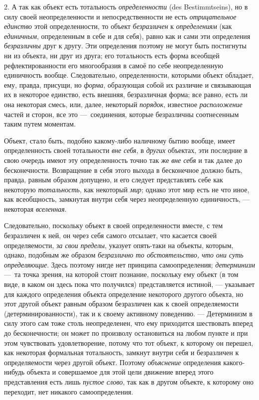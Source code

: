 \documentclass[twoside]{article}
\begin{document}
{{{{{{2. А так как объект есть тотальность
{\em определенности} (des
Bestimmtseins), но в силу своей неопределенности и
непосредственности не есть
{\em отрицательное единство}
этой определенности, то объект
{\em безразличен} к
{\em определениям} (как
{\em единичным},
определенным в себе и для себя), равно как и сами эти
определения {\em безразличны}
друг к другу. Эти определения поэтому не могут быть
постигнуты ни из объекта, ни друг из друга; его тотальность есть форма
всеобщей рефлектированности его многообразия в самоё по себе неопределенную
единичность вообще. Следовательно, определенности, которыми объект
обладает, ему, правда, присущи, но
{\em форма}, образующая
собой их различие и связывающая их в некоторое единство, есть внешняя,
безразличная форма; все равно, есть ли она некоторая смесь, или, далее,
некоторый {\em порядок},
известное
{\em расположение} частей
и сторон, все это —~соединения, которые безразличны
соотнесенным таким путем моментам.

Объект, стало быть, подобно какому-либо наличному бытию
вообще, имеет определенность своей тотальности
{\em вне себя}, в
{\em других} объектах,
эти последние в свою очередь имеют эту определенность точно так же
{\em вне себя} и так
далее до бесконечности. Возвращение в себя этого выхода в бесконечное
должно быть, правда, равным образом допущено, и его следует представлять
себе как некоторую {\em тотальность},
как некоторый {\em мир};
однако этот мир есть не что иное, как всеобщность, замкнутая
внутри себя через неопределенную единичность, — некоторая
{\em вселенная}.

Следовательно, поскольку объект в своей определенности вместе,
с тем безразличен к ней, он через себя самого отсылает, что касается своей
определяемости, {\em за свои пределы},
указует опять-таки на объекты, которым, однако, подобным же
образом {\em безразлично то
обстоятельство, что они суть определяющие}. Здесь поэтому
нигде нет принципа самоопределения;
{\em детерминизм} —~та
точка зрения, на которой стоит познание, поскольку ему объект (в том виде,
в каком он здесь пока что получился) представляется истиной, —
указывает для каждого определения объекта определение
некоторого другого объекта, но этот другой объект равным образом
безразличен как к своей определяемости (детерминированности), так и к
своему активному поведению. — Детерминизм в силу этого сам
тоже столь неопределенен, что ему приходится шествовать вперед до
бесконечности; он может по произволу остановиться на любом пункте и при
этом чувствовать удовлетворение, потому что тот объект, к которому он
перешел, как некоторая формальная тотальность, замкнут внутри себя и
безразличен к определяемости через другой объект. Поэтому
{\em объяснение}
определения какого-нибудь объекта и совершаемое для этой цели
движение вперед этого представления есть лишь
{\em пустое слово}, так
как в другом объекте, к которому оно переходит, нет никакого
самоопределения.

}}}}}}
\end{document}

